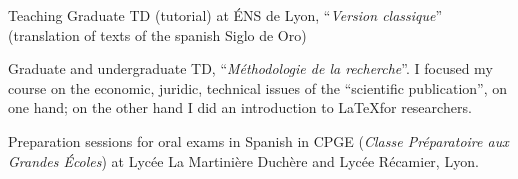 \begin{rubric}{Teaching}
                                \entry*
                            Graduate TD (tutorial) at ÉNS de Lyon, \enquote{\textit{Version classique}}
                        (translation of texts of the spanish Siglo de Oro)
                    
                                \entry*
                            Graduate and undergraduate TD, \enquote{\textit{Méthodologie de la
                            recherche}}. I focused my course on the economic, juridic, technical
                        issues of the \enquote{scientific publication}, on one hand; on the other hand I
                        did an introduction to \LaTeX for researchers.
                    
                                \entry*[2017-2018]
                                
                            Preparation sessions for oral exams in Spanish in CPGE (\textit{Classe
                            Préparatoire aux Grandes Écoles}) at Lycée La Martinière Duchère and
                        Lycée Récamier, Lyon.
                    \end{rubric}


